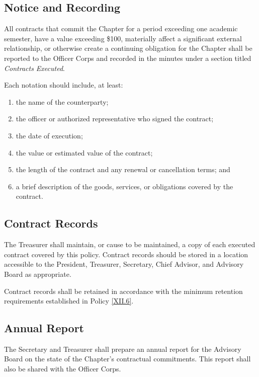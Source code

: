 \subsection{Notice and Recording} \label{XIII.6}
All contracts that commit the Chapter for a period exceeding one academic semester, have a value exceeding \$100, materially affect a significant external relationship, 
or otherwise create a continuing obligation for the Chapter shall be reported to the Officer Corps and recorded in the minutes under a section titled \textit{Contracts Executed}.

Each notation should include, at least:
\begin{enumerate}
    \item the name of the counterparty;
    \item the officer or authorized representative who signed the contract;
    \item the date of execution;
    \item the value or estimated value of the contract;
    \item the length of the contract and any renewal or cancellation terms; and
    \item a brief description of the goods, services, or obligations covered by the contract.
\end{enumerate}

\subsection{Contract Records} \label{XIII.7}
The Treasurer shall maintain, or cause to be maintained, a copy of each executed contract covered by this policy. 
Contract records should be stored in a location accessible to the President, Treasurer, Secretary, Chief Advisor, and Advisory Board as appropriate.

Contract records shall be retained in accordance with the minimum retention requirements established in Policy \ref{XII.6}.

\subsection{Annual Report} \label{XIII.8}
The Secretary and Treasurer shall prepare an annual report for the Advisory Board on the state of the Chapter’s contractual commitments. This report shall also be shared with the Officer Corps.

